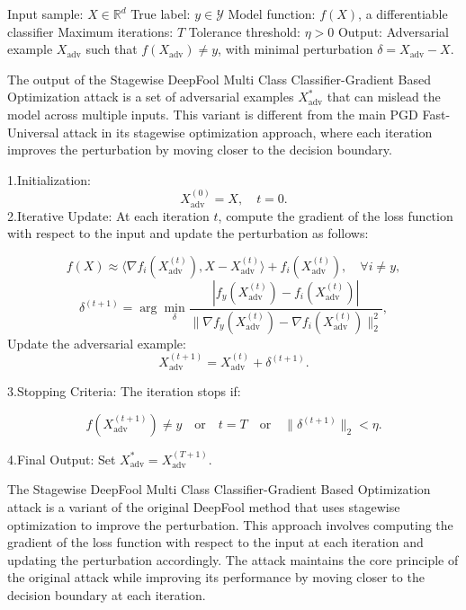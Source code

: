 Input sample: $X \in \mathbb{R}^d$
True label: $y \in \mathcal{Y}$
Model function: $f(X)$, a differentiable classifier
Maximum iterations: $T$
Tolerance threshold: $\eta > 0$
Output: Adversarial example $X_{\text{adv}}$ such that $f(X_{\text{adv}}) \neq y$, with minimal perturbation $\delta = X_{\text{adv}} - X$.

The output of the Stagewise DeepFool Multi Class Classifier-Gradient Based Optimization attack is a set of adversarial examples $X^*_{\text{adv}}$ that can mislead the model across multiple inputs. This variant is different from the main PGD Fast-Universal attack in its stagewise optimization approach, where each iteration improves the perturbation by moving closer to the decision boundary.

1.Initialization:
   \[
   X^{(0)}_{\text{adv}} = X, \quad t = 0.
   \]
2.Iterative Update:
At each iteration $t$, compute the gradient of the loss function with respect to the input and update the perturbation as follows:

   \[
   f(X) \approx \langle \nabla f_i(X^{(t)}_{\text{adv}}), X - X^{(t)}_{\text{adv}} \rangle + f_i(X^{(t)}_{\text{adv}}), \quad \forall i \neq y,
   \]
   \[
   \delta^{(t+1)} = \arg\min_{\delta} \frac{|f_y(X^{(t)}_{\text{adv}}) - f_i(X^{(t)}_{\text{adv}})|}{\|\nabla f_y(X^{(t)}_{\text{adv}}) - \nabla f_i(X^{(t)}_{\text{adv}})\|_2^2},
   \]
   Update the adversarial example:
   \[
   X^{(t+1)}_{\text{adv}} = X^{(t)}_{\text{adv}} + \delta^{(t+1)}.
   \]

3.Stopping Criteria:
   The iteration stops if:

   \[
   f(X^{(t+1)}_{\text{adv}}) \neq y \quad \text{or} \quad t = T \quad \text{or} \quad \|\delta^{(t+1)}\|_2 < \eta.
   \]

4.Final Output:
Set $X^*_{\text{adv}} = X^{(T+1)}_{\text{adv}}$.

The Stagewise DeepFool Multi Class Classifier-Gradient Based Optimization attack is a variant of the original DeepFool method that uses stagewise optimization to improve the perturbation. This approach involves computing the gradient of the loss function with respect to the input at each iteration and updating the perturbation accordingly. The attack maintains the core principle of the original attack while improving its performance by moving closer to the decision boundary at each iteration.